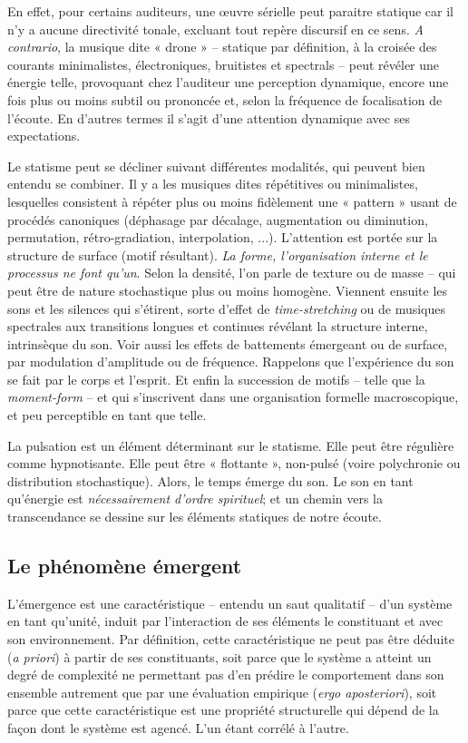 \documentclass{article}
\begin{document}
En effet, pour certains auditeurs, une œuvre sérielle peut paraitre statique car il n'y a aucune directivité tonale, excluant tout repère discursif en ce sens. \textit{A contrario}, la musique dite « drone »  -- statique par définition, à la croisée des courants minimalistes, électroniques, bruitistes et spectrals -- peut révéler une énergie telle, provoquant chez l'auditeur une perception dynamique, encore une fois plus ou moins subtil ou prononcée et, selon la fréquence de focalisation de l'écoute. En d'autres termes il s'agit d'une attention dynamique avec ses expectations.

Le statisme peut se décliner suivant différentes modalités, qui peuvent bien entendu se combiner. Il y a les musiques dites répétitives ou minimalistes, lesquelles consistent à répéter plus ou moins fidèlement une « pattern » usant de procédés canoniques (déphasage par décalage, augmentation ou diminution, permutation, rétro-gradiation, interpolation, ...). L'attention est portée sur la structure de surface (motif résultant). \textit{La  forme, l'organisation interne et le processus ne font qu'un}. Selon la densité, l'on parle de texture ou de masse -- qui peut être de nature stochastique plus ou moins homogène. Viennent ensuite les sons et les silences qui s'étirent, sorte d'effet de \textit{time-stretching} ou de musiques spectrales aux transitions longues et continues révélant la structure interne, intrinsèque du son. Voir aussi les effets de battements émergeant ou de surface, par modulation d'amplitude ou de fréquence. Rappelons que l'expérience du son se fait par le corps et l'esprit. Et enfin la succession de motifs -- telle que la \textit{moment-form} -- et qui s'inscrivent dans une organisation formelle macroscopique, et peu perceptible en tant que telle.

La pulsation est un élément déterminant sur le statisme. Elle peut être régulière comme hypnotisante. Elle peut être « flottante », non-pulsé (voire polychronie ou distribution stochastique). Alors, le temps émerge du son. Le son en tant qu'énergie est \textit{nécessairement d’ordre spirituel}; et un chemin vers la transcendance se dessine sur les éléments statiques de notre écoute.

\subsection*{Le phénomène émergent}
 
 L'émergence est une caractéristique -- entendu un saut qualitatif -- d'un système en tant qu'unité, induit par l'interaction de ses éléments le constituant et avec son environnement. Par définition, cette caractéristique ne peut pas être déduite (\textit{a priori}) à partir de ses constituants, soit parce que le système a atteint un degré de complexité ne permettant pas d'en prédire le comportement dans son ensemble autrement que par une évaluation empirique (\textit{ergo aposteriori}), soit parce que cette caractéristique est une propriété structurelle qui dépend de la façon dont le système est agencé. 
 L'un étant corrélé à l'autre.
\end{document}

